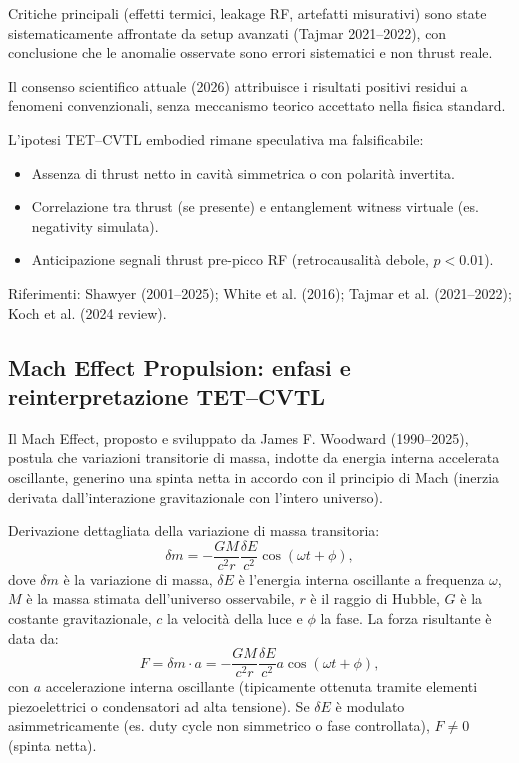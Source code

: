 \documentclass[11pt,a4paper]{article}
\theoremstyle{plain}
\theoremstyle{definition}
\begin{document}
Critiche principali (effetti termici, leakage RF, artefatti misurativi) sono state sistematicamente affrontate da setup avanzati (Tajmar 2021--2022), con conclusione che le anomalie osservate sono errori sistematici e non thrust reale. 

\vspace{0.2cm}

Il consenso scientifico attuale (2026) attribuisce i risultati positivi residui a fenomeni convenzionali, senza meccanismo teorico accettato nella fisica standard.


\vspace{0.2cm}



L’ipotesi TET--CVTL embodied rimane speculativa ma falsificabile: 
\begin{itemize}
    \item Assenza di thrust netto in cavità simmetrica o con polarità invertita.
    \item Correlazione tra thrust (se presente) e entanglement witness virtuale (es. negativity simulata).
    \item Anticipazione segnali thrust pre-picco RF (retrocausalità debole, $p < 0.01$).
\end{itemize}

Riferimenti: Shawyer (2001--2025); White et al. (2016); Tajmar et al. (2021--2022); Koch et al. (2024 review).




\vspace{0.4cm}

\subsection{Mach Effect Propulsion: enfasi e reinterpretazione TET--CVTL}

Il Mach Effect, proposto e sviluppato da James F. Woodward (1990--2025), postula che variazioni transitorie di massa, indotte da energia interna accelerata oscillante, generino una spinta netta in accordo con il principio di Mach (inerzia derivata dall'interazione gravitazionale con l'intero universo).

Derivazione dettagliata della variazione di massa transitoria:
\begin{equation}
    \delta m = -\frac{G M}{c^2 r} \frac{\delta E}{c^2} \cos(\omega t + \phi),
    \label{eq:delta_m_mach}
\end{equation}
dove $\delta m$ è la variazione di massa, $\delta E$ è l'energia interna oscillante a frequenza $\omega$, $M$ è la massa stimata dell'universo osservabile, $r$ è il raggio di Hubble, $G$ è la costante gravitazionale, $c$ la velocità della luce e $\phi$ la fase. La forza risultante è data da:
\begin{equation}
    F = \delta m \cdot a = -\frac{G M}{c^2 r} \frac{\delta E}{c^2} a \cos(\omega t + \phi),
    \label{eq:F_mach}
\end{equation}
con $a$ accelerazione interna oscillante (tipicamente ottenuta tramite elementi piezoelettrici o condensatori ad alta tensione). Se $\delta E$ è modulato asimmetricamente (es. duty cycle non simmetrico o fase controllata), $F \neq 0$ (spinta netta).
\end{document}
